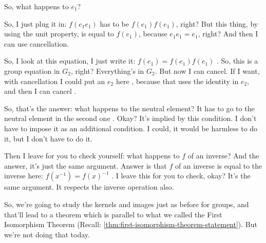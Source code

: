 \begin{speech}[00:59:44 - 01:01:49]
So, what happens to $e_1$? 

So, I just plug it in: $f(e_1 e_1)$ has to be $f(e_1) f(e_1)$, right?  But this thing, by using the unit property, is equal to $f(e_1)$, because $e_1 e_1 = e_1$, right?  And then I can use cancellation.

So, I look at this equation, I just write it: $f(e_1) = f(e_1) f(e_1)$ . So, this is a group equation in $G_2$, right? Everything's in $G_2$. But now I can cancel. If I want, with cancellation I could put an $e_2$ here , because that uses the identity in $e_2$, and then I can cancel .

So, that's the answer: what happens to the neutral element? It has to go to the neutral element in the second one . Okay? It's implied by this condition. I don't have to impose it as an additional condition. I could, it would be harmless to do it, but I don't have to do it.

Then I leave for you to check yourself: what happens to $f$ of an inverse?  And the answer, it's just the same argument. Answer is that $f$ of an inverse is equal to the inverse here: $f(x^{-1}) = f(x)^{-1}$ . I leave this for you to check, okay? It's the same argument. It respects the inverse operation also.

So, we're going to study the kernels and images just as before for groups, and that'll lead to a theorem which is parallel to what we called the First Isomorphism Theorem (Recall: \cref{thm:first-isomorphism-theorem-statement}). But we're not doing that today.
\end{speech}

